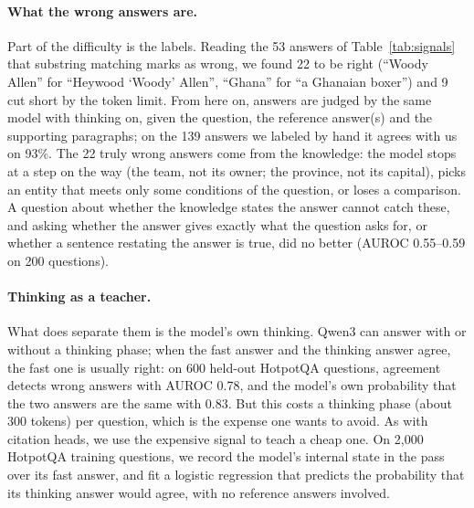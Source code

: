 \documentclass[11pt]{article}
\begin{document}
\paragraph{What the wrong answers are.} Part of the difficulty is the labels. Reading the 53 answers of Table~\ref{tab:signals} that substring matching marks as wrong, we found 22 to be right (``Woody Allen'' for ``Heywood `Woody' Allen'', ``Ghana'' for ``a Ghanaian boxer'') and 9 cut short by the token limit. From here on, answers are judged by the same model with thinking on, given the question, the reference answer(s) and the supporting paragraphs; on the 139 answers we labeled by hand it agrees with us on 93\%. The 22 truly wrong answers come from the knowledge: the model stops at a step on the way (the team, not its owner; the province, not its capital), picks an entity that meets only some conditions of the question, or loses a comparison. A question about whether the knowledge states the answer cannot catch these, and asking whether the answer gives exactly what the question asks for, or whether a sentence restating the answer is true, did no better (AUROC 0.55--0.59 on 200 questions).

\paragraph{Thinking as a teacher.} What does separate them is the model's own thinking. Qwen3 can answer with or without a thinking phase; when the fast answer and the thinking answer agree, the fast one is usually right: on 600 held-out HotpotQA questions, agreement detects wrong answers with AUROC 0.78, and the model's own probability that the two answers are the same with 0.83. But this costs a thinking phase (about 300 tokens) per question, which is the expense one wants to avoid. As with citation heads, we use the expensive signal to teach a cheap one. On 2{,}000 HotpotQA training questions, we record the model's internal state in the pass over its fast answer, and fit a logistic regression that predicts the probability that its thinking answer would agree, with no reference answers involved.
\end{document}
